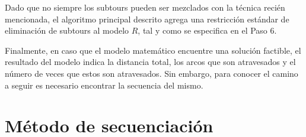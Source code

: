 Dado que no siempre los subtours pueden ser mezclados con la técnica recién mencionada, el algoritmo principal descrito agrega una restricción estándar de eliminación de subtours al modelo $R$, tal y como se especifica en el Paso 6.

Finalmente, en caso que el modelo matemático encuentre una solución factible, el resultado del modelo indica la distancia total, los arcos que son atravesados y el número de veces que estos son atravesados. Sin embargo, para conocer el camino a seguir es necesario encontrar la secuencia del mismo. 

\section{Método de secuenciación}




